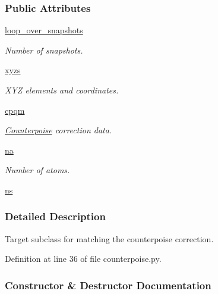 \subsubsection*{Public Attributes}
\begin{DoxyCompactItemize}
\item 
\hyperlink{classsrc_1_1counterpoise_1_1Counterpoise_a71bc5013fdd67cefce837e6f0220f48b}{loop\+\_\+over\+\_\+snapshots}
\begin{DoxyCompactList}\small\item\em Number of snapshots. \end{DoxyCompactList}\item 
\hyperlink{classsrc_1_1counterpoise_1_1Counterpoise_ad1e40b97146b0e240aa165177d92a35f}{xyzs}
\begin{DoxyCompactList}\small\item\em X\+YZ elements and coordinates. \end{DoxyCompactList}\item 
\hyperlink{classsrc_1_1counterpoise_1_1Counterpoise_ad0dc00b1c4ab441ef560387b39127d2d}{cpqm}
\begin{DoxyCompactList}\small\item\em \hyperlink{classsrc_1_1counterpoise_1_1Counterpoise}{Counterpoise} correction data. \end{DoxyCompactList}\item 
\hyperlink{classsrc_1_1counterpoise_1_1Counterpoise_a9be863410e26b800d3d92576679517b0}{na}
\begin{DoxyCompactList}\small\item\em Number of atoms. \end{DoxyCompactList}\item 
\hyperlink{classsrc_1_1counterpoise_1_1Counterpoise_aeff7f3fb18a029eec7b6bb52979fd58f}{ns}
\end{DoxyCompactItemize}


\subsubsection{Detailed Description}
Target subclass for matching the counterpoise correction. 



Definition at line 36 of file counterpoise.\+py.



\subsubsection{Constructor \& Destructor Documentation}
\mbox{\label{classsrc_1_1counterpoise_1_1Counterpoise_ae6afcfe82039112c68507ef5e5e32f83}} 
